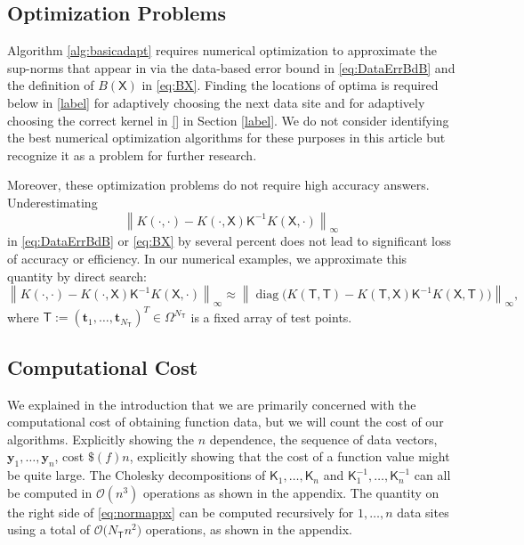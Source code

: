 \documentclass[]{mcom-l}
\theoremstyle{remark}
\DeclareMathOperator{\diag}{diag}
\newcommand{\NT}{{N_{\mT}}}
\newcommand{\mK}{\mathsf{K}}
\newcommand{\mT}{\mathsf{T}}
\newcommand{\mX}{\mathsf{X}}
\newcommand{\by}{{\boldsymbol{y}}}
\newcommand{\bt}{{\boldsymbol{t}}}
\newcommand{\cx}{{\Omega}}
\newcommand{\norm}[2][{}]{\ensuremath{\left \lVert #2 \right \rVert}_{#1}}
\newcommand{\Order}{\mathcal{O}}
\begin{document}
\subsection{Optimization Problems} \label{sec:compCost}

Algorithm \ref{alg:basicadapt} requires numerical optimization to  
approximate the sup-norms that appear in via the data-based error bound in \eqref{eq:DataErrBdB} and the definition of $B(\mX)$ in \eqref{eq:BX}.  Finding the locations of optima is required below in \eqref{label} for adaptively choosing the next data site and for adaptively choosing the correct kernel in \eqref{} in Section \ref{label}.  We do not consider identifying the best numerical optimization algorithms for these purposes in this article but recognize it as a problem for further research.  

Moreover, these optimization problems do not require high accuracy answers.  Underestimating 
\[\norm[\infty]{K(\cdot,\cdot) - K(\cdot,\mX) \mK^{-1} K(\mX,\cdot)}\]
in  \eqref{eq:DataErrBdB} or  \eqref{eq:BX} by several percent does not lead to significant loss of accuracy or efficiency.  
In our numerical examples, we approximate this quantity by direct search:
\begin{equation} \label{eq:normappx}
\norm[\infty]{K(\cdot,\cdot) - K(\cdot,\mX) \mK^{-1} K(\mX,\cdot)} \approx \norm[\infty]{\diag\bigl(K(\mT,\mT) - K(\mT,\mX) \mK^{-1} K(\mX,\mT) \bigr)},
\end{equation}
where $\mT := (\bt_1, \ldots, \bt_\NT)^T \in \cx^\NT$ is a fixed array of test points.



\subsection{Computational Cost} \label{sec:compCost}
We explained in the introduction that we are primarily concerned with the computational cost of obtaining function data, but we will count the cost of our algorithms.  Explicitly showing the $n$ dependence, the sequence of data vectors, $\by_1, \ldots, \by_n$, cost $\$(f)n$, explicitly showing that the cost of a function value might be quite large.  The Cholesky decompositions of $\mK_1, \ldots, \mK_n$ and $\mK_1^{-1}, \ldots, \mK_n^{-1}$ can all be computed in $\Order(n^3)$ operations as shown in the appendix.  The quantity on the right side of \eqref{eq:normappx} can be computed recursively for $1, \ldots, n$ data sites using a total of $\Order\bigl( \NT n^2 \bigr)$ operations, as shown in the appendix.  
\end{document}
